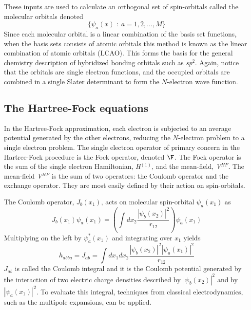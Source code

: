 \documentclass[11pt,oneside,final]{huthesis}%
\begin{document}
These inputs are used to calculate an orthogonal set of spin-orbitals called the molecular orbitals denoted
\begin{equation}
\{\psi _{a} (x) \;:\; a=1, 2,\dots , M\}       
\label{GrindEQ__7_20_}
\end{equation}
Since each molecular orbital is a linear combination of the basis set functions, when the basis sets consists of atomic orbitals this method is known as the linear combination of atomic orbitals (LCAO). This forms the basis for the general chemistry description of hybridized bonding orbitals such as \textit{sp}${}^{2}$.  Again, notice that the orbitals are single electron functions, and the occupied orbitals are combined in a single Slater determinant to form the $N$-electron wave function.

 
\subsection{The Hartree-Fock equations}

In the Hartree-Fock approximation, each electron is subjected to an average potential generated by the other electrons, reducing the $N$-electron problem to a single electron problem.  The single electron operator of primary concern in the Hartree-Fock procedure is the {Fock operator}, denoted $\F$.   The Fock operator is the sum of the single electron Hamiltonian, \textit{H}${}^{(1)}$, and the mean-field, \textit{V}${}^{HF}$.   The mean-field \textit{V}${}^{HF}$ is the sum of two operators: the {Coulomb operator} and the {exchange operator}.  They are most easily defined by their action on spin-orbitals. 

The Coulomb operator, $J_{b} (x_{1} )$, acts on molecular spin-orbital $\psi _{a} (x_{1} )$ as 
\begin{equation} \label{GrindEQ__7_21_} 
J_{b} (x_{1} )\psi _{a} (x_{1} )=\left(\int dx_{2} \frac{\left|\psi _{b} (x_{2} )\right|^{2} }{r_{12} }  \right)\psi _{a} (x_{1} )
\end{equation} 
Multiplying on the left by $\psi _{a}^{*} (x_{1} )$ and integrating over ${x}_{1}$ yields 
\begin{equation} \label{GrindEQ__7_22_} 
h_{abba} =J_{ab} =\int dx_{1} dx_{2} \frac{\left|\psi _{b} (x_{2} )\right|^{2} \left|\psi _{a} (x_{1} )\right|^{2} }{r_{12} }  
\end{equation} 
$J_{ab} $ is called the Coulomb integral and it is the Coulomb potential generated by the interaction of two electric charge densities described by  $\left|\psi _{b} (x_{2} )\right|^{2} $ and by $\left|\psi _{a} (x_{1} )\right|^{2} $.  To evaluate this integral, techniques from classical electrodynamics, such as the multipole expansions, can be applied.  
\end{document}

